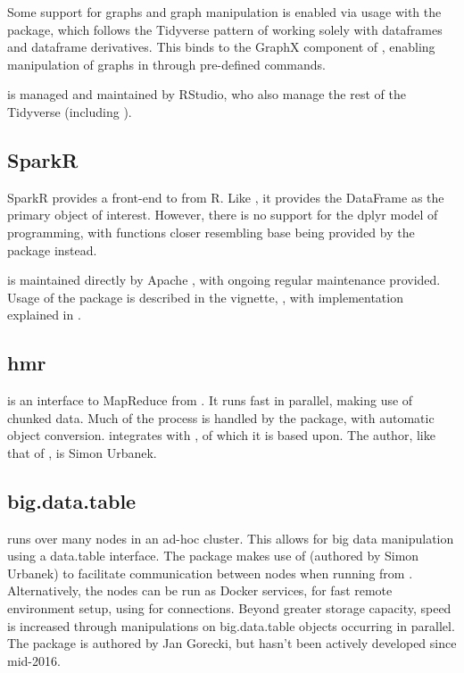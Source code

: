 Some support for graphs and graph manipulation is enabled via usage with the  package, which follows the Tidyverse pattern of working solely with dataframes and dataframe derivatives\cite{kuo18}.
This binds to the GraphX component of , enabling manipulation of graphs in  through pre-defined commands.

 is managed and maintained by RStudio, who also manage the rest
of the Tidyverse (including ).

\subsection{SparkR}\label{subsec:sparkr}

SparkR provides a front-end to  from R\cite{venkataraman20:_spark}.
Like , it provides the DataFrame as the primary object of interest.
However, there is no support for the dplyr model of programming, with functions closer resembling base \R{} being provided by the package instead.

 is maintained directly by Apache , with ongoing regular
maintenance provided.
Usage of the package is described in the vignette, \textcite{venktaraman19:spark-pract-guide}, with implementation explained in \cite{venkataraman2016sparkr}.

\subsection{hmr}\label{subsec:hmr}

 is an interface to MapReduce from \R{}\cite{urbanek20}.
It runs fast in parallel, making use of chunked data.
Much of the process is handled by the package, with automatic \R{} object conversion.
 integrates with
, of which it is based upon.
The author, like that of , is Simon Urbanek.

\subsection{big.data.table}\label{subsec:big.data.table}

 runs  over many nodes in an ad-hoc
cluster\cite{gorecki16}.
This allows for big data manipulation using a data.table interface.
The package makes use of  (authored by Simon Urbanek) to facilitate communication between nodes when running from \R{}.
Alternatively, the nodes can be run as Docker services, for fast remote environment setup, using  for connections.
Beyond greater storage capacity, speed is increased through manipulations on big.data.table objects occurring in parallel.
The package is authored by Jan Gorecki, but hasn't been actively developed since mid-2016.
